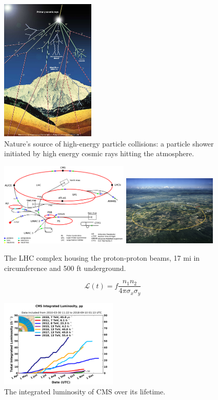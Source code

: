 \begin{figure}[hbp!]
\centering
\includegraphics[width=0.4\textwidth]{figs/cosmic-rays.jpg}
\caption[High energy cosmic rays in the atmosphere.]{Nature's source of high-energy particle collisions: a particle shower initiated by high energy cosmic rays hitting the atmosphere.}
\label{fig:cosmicrays}
\end{figure}

\begin{figure}[hbp!]
\centering
\includegraphics[width=0.55\textwidth]{figs/lhcschematic.png}
\includegraphics[width=0.4\textwidth]{figs/lhc.jpg}
\caption[The LHC complex.]{The LHC complex housing the proton-proton beams, 17 mi in circumference and 500 ft underground.}
\label{fig:lhc}
\end{figure}

\begin{equation}
\mathcal{L}(t) = f \frac{n_{1} n_{2}}{4\pi\sigma_{x}\sigma_{y}}
\end{equation}

\begin{figure}[hbp!]
\centering
\includegraphics[width=0.5\textwidth]{figs/int_lumi_cumulative_pp_2.pdf}
\caption{The integrated luminosity of CMS over its lifetime.}
\label{fig:lumi}
\end{figure}
